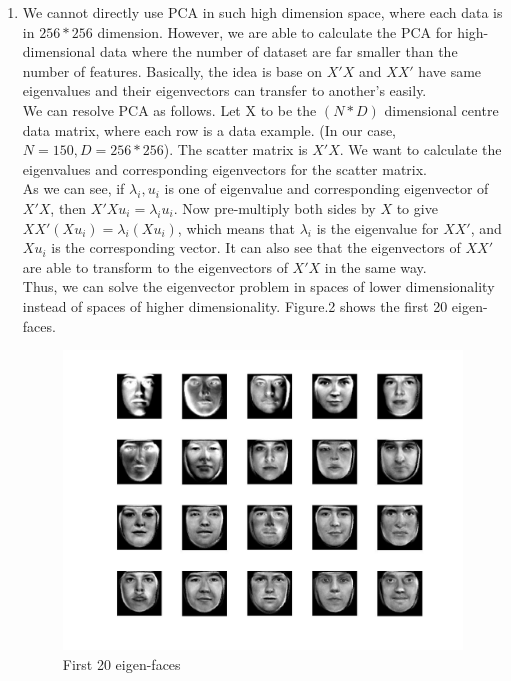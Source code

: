 \documentclass[12pt]{ctexart}
\begin{document}
\begin{enumerate}
\begin{enumerate}
\item
We cannot directly use PCA in such high dimension space, where each data is in $256*256$ dimension. However, we are able to calculate the PCA for high-dimensional data where the number of dataset are far smaller than the number of features. Basically, the idea is base on $X'X$ and $XX'$ have same eigenvalues and their eigenvectors can transfer to another's easily. \\
We can resolve PCA as follows. Let X to be the $(N * D)$ dimensional centre data matrix, where each row is a data example. (In our case, $N = 150, D = 256*256$). The scatter matrix is $X'X$. We want to calculate the eigenvalues and corresponding eigenvectors for the scatter matrix. \\
As we can see, if $\lambda_i, u_i$ is one of eigenvalue and corresponding eigenvector of $X'X$,  then $X'X u_i = \lambda_i u_i$. Now pre-multiply both sides by $X$ to give $XX' (Xu_i) = \lambda_i (X u_i)$, which means that $\lambda_i$ is the eigenvalue for $XX'$, and $Xu_i$ is the corresponding vector. It can also see that the eigenvectors of $XX'$ are able to transform to the eigenvectors of $X'X$ in the same way. \\
Thus, we can solve the eigenvector problem in spaces of lower dimensionality instead of spaces of higher dimensionality. Figure.2 shows the first 20 eigen-faces. \\
\begin{figure}[H]
  \centering
  \includegraphics[scale=0.3]{a_first20eigenface.jpg} 
  \caption{First 20 eigen-faces}
\end{figure}


\end{enumerate}
\end{enumerate}
\end{document}
